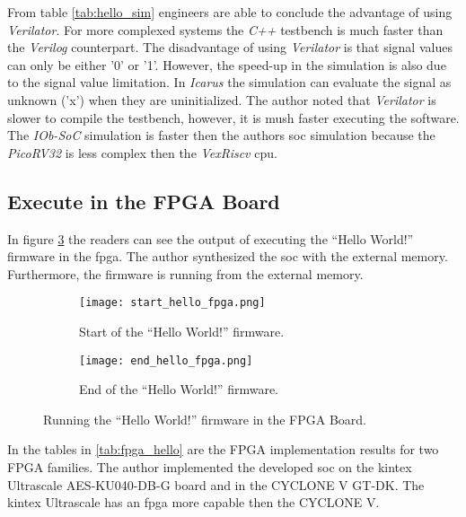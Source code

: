 From table \ref{tab:hello_sim} engineers are able to conclude the advantage of using \textit{Verilator}. For more complexed systems the \textit{C++} testbench is much faster than the \textit{Verilog} counterpart. The disadvantage of using \textit{Verilator} is that signal values can only be either '0' or '1'. However, the speed-up in the simulation is also due to the signal value limitation. In \textit{Icarus} the simulation can evaluate the signal as unknown ('x') when they are uninitialized. The author noted that \textit{Verilator} is slower to compile the testbench, however, it is mush faster executing the software. The \textit{IOb-SoC} simulation is faster then the authors \acrshort{soc} simulation because the \textit{PicoRV32} is less complex then the \textit{VexRiscv} \acrshort{cpu}.

\subsection{Execute in the FPGA Board}
In figure \ref{fig:hello_fpga} the readers can see the output of executing the \enquote{Hello World!} firmware in the \acrshort{fpga}. The author synthesized the \acrshort{soc} with the external memory. Furthermore, the firmware is running from the external memory.

\begin{figure}[!ht]
    \centering
    \begin{subfigure}[b]{0.49\textwidth}
        \centering
        \texttt{[image: start\_hello\_fpga.png]}
        \caption{Start of the \enquote{Hello World!} firmware.}
        \label{fig:start_hello_fpga}
    \end{subfigure}
    \hfill
    \begin{subfigure}[b]{0.49\textwidth}
        \centering
        \texttt{[image: end\_hello\_fpga.png]}
        \caption{End of the \enquote{Hello World!} firmware.}
        \label{fig:end_hello_fpga}
    \end{subfigure}
    \caption{Running the \enquote{Hello World!} firmware in the FPGA Board.}
    \label{fig:hello_fpga}
\end{figure}

In the tables in \ref{tab:fpga_hello} are the FPGA implementation results for two FPGA families. The author implemented the developed \acrshort{soc} on the kintex Ultrascale AES-KU040-DB-G board and in the CYCLONE V GT-DK. The kintex Ultrascale has an \acrshort{fpga} more capable then the CYCLONE V.

